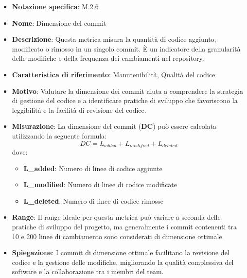 \begin{itemize}
    \item \textbf{Notazione specifica}: M.2.6
    \item \textbf{Nome}: Dimensione del commit
    \item \textbf{Descrizione}: Questa metrica misura la quantità di codice aggiunto, modificato o rimosso in un singolo commit. È un indicatore della granularità delle modifiche e della frequenza dei cambiamenti nel repository.
    \item \textbf{Caratteristica di riferimento}: Manutenibilità, Qualità del codice
    \item \textbf{Motivo}: Valutare la dimensione dei commit aiuta a comprendere la strategia di gestione del codice e a identificare pratiche di sviluppo che favoriscono la leggibilità e la facilità di revisione del codice.
    \item \textbf{Misurazione}: La dimensione del commit (\textbf{DC}) può essere calcolata utilizzando la seguente formula:
    \[ DC = L_{added} + L_{modified} + L_{deleted} \]
    dove:
    \begin{itemize}
        \item \textbf{L_{added}}: Numero di linee di codice aggiunte
        \item \textbf{L_{modified}}: Numero di linee di codice modificate
        \item \textbf{L_{deleted}}: Numero di linee di codice rimosse
    \end{itemize}
    \item \textbf{Range}: Il range ideale per questa metrica può variare a seconda delle pratiche di sviluppo del progetto, ma generalmente i commit contenenti tra 10 e 200 linee di cambiamento sono considerati di dimensione ottimale.
    \item \textbf{Spiegazione}: I commit di dimensione ottimale facilitano la revisione del codice e la gestione delle modifiche, migliorando la qualità complessiva del software e la collaborazione tra i membri del team.
\end{itemize}
